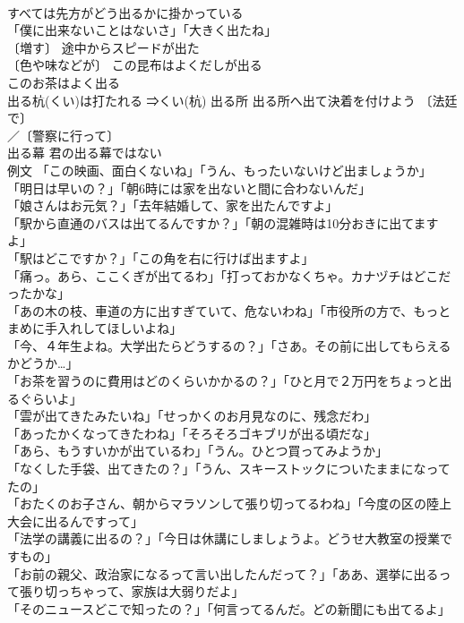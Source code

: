 \documentclass[8pt]{extreport}
\begin{document}
\begin{CJK}{UTF8}{min}
\\	すべては先方がどう出るかに掛かっている 
\\	「僕に出来ないことはないさ」「大きく出たね」 
\\	〔増す〕 途中からスピードが出た 
\\	〔色や味などが〕 この昆布はよくだしが出る 
\\	このお茶はよく出る 
\\	出る杭(くい)は打たれる ⇒くい(杭) 出る所 出る所へ出て決着を付けよう 〔法廷で〕
\\	／〔警察に行って〕
\\	出る幕 君の出る幕ではない 
\\	例文 「この映画、面白くないね」「うん、もったいないけど出ましょうか」 
\\	「明日は早いの？」「朝6時には家を出ないと間に合わないんだ」 
\\	「娘さんはお元気？」「去年結婚して、家を出たんですよ」 
\\	「駅から直通のバスは出てるんですか？」「朝の混雑時は10分おきに出てますよ」 
\\	「駅はどこですか？」「この角を右に行けば出ますよ」 
\\	「痛っ。あら、ここくぎが出てるわ」「打っておかなくちゃ。カナヅチはどこだったかな」 
\\	「あの木の枝、車道の方に出すぎていて、危ないわね」「市役所の方で、もっとまめに手入れしてほしいよね」 
\\	「今、４年生よね。大学出たらどうするの？」「さあ。その前に出してもらえるかどうか…」 
\\	「お茶を習うのに費用はどのくらいかかるの？」「ひと月で２万円をちょっと出るぐらいよ」 
\\	「雲が出てきたみたいね」「せっかくのお月見なのに、残念だわ」 
\\	「あったかくなってきたわね」「そろそろゴキブリが出る頃だな」 
\\	「あら、もうすいかが出ているわ」「うん。ひとつ買ってみようか」 
\\	「なくした手袋、出てきたの？」「うん、スキーストックについたままになってたの」 
\\	「おたくのお子さん、朝からマラソンして張り切ってるわね」「今度の区の陸上大会に出るんですって」 
\\	「法学の講義に出るの？」「今日は休講にしましょうよ。どうせ大教室の授業ですもの」 
\\	「お前の親父、政治家になるって言い出したんだって？」「ああ、選挙に出るって張り切っちゃって、家族は大弱りだよ」 
\\	「そのニュースどこで知ったの？」「何言ってるんだ。どの新聞にも出てるよ」 

\end{CJK}
\end{document}
